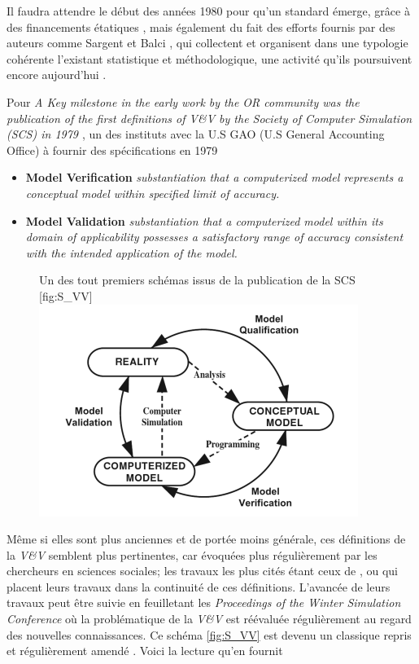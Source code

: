 Il faudra attendre le début des années 1980 pour qu'un standard émerge, grâce à des financements étatiques \autocite{Balci1986}, mais également du fait des efforts fournis par des auteurs comme Sargent et Balci \autocite{Nance2002}, qui collectent et organisent dans une typologie cohérente l'existant statistique et méthodologique, une activité qu'ils poursuivent encore aujourd'hui \autocite{Balci1998}.

Pour \autocite[22]{Oberkampf2010} \textit{A Key milestone in the early work by the OR community was the publication of the first definitions of V\&V by the Society of Computer Simulation (SCS) in 1979 \autocite{Schlesinger1979}}, un des instituts avec la U.S GAO (U.S General Accounting Office) à fournir des spécifications en 1979 \autocite{Balci1986} 

\begin{itemize}
\item \textbf{Model Verification} \textit{substantiation that a computerized model represents a conceptual model within specified limit of accuracy.}
\item \textbf{Model Validation} \textit{substantiation that a computerized model within its domain of applicability possesses a satisfactory range of accuracy consistent with the intended application of the model.}
\end{itemize}

\begin{figure}[h]
\begin{sidecaption}[fortoc]{Un des tout premiers schémas issus de la publication de la SCS \autocite{Oberkampf2010,Schlesinger1979}}[fig:S_VV]
  \centering
 \includegraphics[width=.7\linewidth]{schelinger_schema1979.png}
  \end{sidecaption}
\end{figure}

Même si elles sont plus anciennes et de portée moins générale, ces définitions de la \textit{V\&V} semblent plus pertinentes, car évoquées plus régulièrement par les chercheurs en sciences sociales; les travaux les plus cités étant ceux de \textcite{Kleijnen1995}, ou \textcite{Sargent2010} qui placent leurs travaux dans la continuité de ces définitions. L'avancée de leurs travaux peut être suivie en feuilletant les \textit{Proceedings of the Winter Simulation Conference} où la problématique de la \textit{V\&V} est réévaluée régulièrement au regard des nouvelles connaissances. Ce schéma \ref{fig:S_VV} est devenu un classique repris et régulièrement amendé \autocite{Sargent2010}. Voici la lecture qu'en fournit \autocite{Oberkampf2010} 

